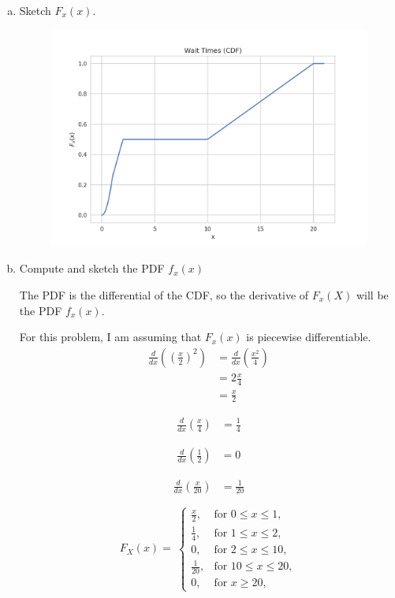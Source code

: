 \documentclass[12pt]{article}
\begin{document}
\begin{enumerate}[(a)]
  \item 
    Sketch $F_x(x)$.
    \begin{figure}[H]\centering
      \includegraphics[scale=0.7]{plot-wait-times-cdf}
    \end{figure}
    \newpage
    
  \item 
    Compute and sketch the PDF $f_x(x)$
    
    The PDF is the differential of the CDF, so the derivative of $F_x(X)$ will be the PDF $f_x(x)$.
    
    For this problem, I am assuming that $F_x(x)$ is piecewise differentiable.\\
    \begin{align*}
    \frac{d}{dx}({(\frac{x}{2})}^2) &= \frac{d}{dx}(\frac{x^2}{4})\\
    &= 2\frac{x}{4}\\
    &= \frac{x}{2}
    \end{align*}
    
    \begin{align*}
    \frac{d}{dx}(\frac{x}{4}) &= \frac{1}{4}
    \end{align*}
    
    \begin{align*}
    \frac{d}{dx}(\frac{1}{2}) &= 0
    \end{align*}
    
    \begin{align*}
    \frac{d}{dx}(\frac{x}{20}) &= \frac{1}{20}
    \end{align*}
    
    \begin{equation*}
      F_X(x)=\
        \begin{cases}
          \frac{x}{2}, & \text{for }0\leq x \leq1,\\
          \frac{1}{4},  & \text{for }1\leq x \leq2,\\
          0,            & \text{for }2\leq x \leq10,\\
          \frac{1}{20}, & \text{for }10\leq x \leq20,\\
          0,            & \text{for }x\geq 20,
        \end{cases}
    \end{equation*}
    

\end{enumerate}
\end{document}
